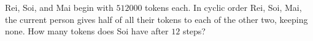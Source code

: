 Rei, Soi, and Mai begin with $512000$ tokens each. In cyclic order Rei, Soi, Mai, the current person gives half of all their tokens to each of the other two, keeping none. How many tokens does Soi have after $12$ steps?
